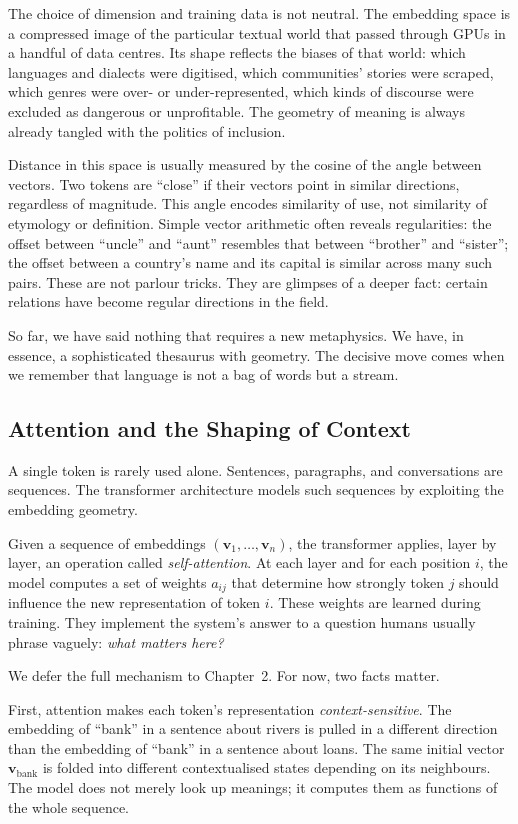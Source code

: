 The choice of dimension and training data is not neutral. The embedding space is a compressed image of the particular textual world that passed through GPUs in a handful of data centres. Its shape reflects the biases of that world: which languages and dialects were digitised, which communities' stories were scraped, which genres were over- or under-represented, which kinds of discourse were excluded as dangerous or unprofitable. The geometry of meaning is always already tangled with the politics of inclusion.

Distance in this space is usually measured by the cosine of the angle between vectors. Two tokens are ``close'' if their vectors point in similar directions, regardless of magnitude. This angle encodes similarity of use, not similarity of etymology or definition. Simple vector arithmetic often reveals regularities: the offset between ``uncle'' and ``aunt'' resembles that between ``brother'' and ``sister''; the offset between a country's name and its capital is similar across many such pairs. These are not parlour tricks. They are glimpses of a deeper fact: certain relations have become regular directions in the field.

So far, we have said nothing that requires a new metaphysics. We have, in essence, a sophisticated thesaurus with geometry. The decisive move comes when we remember that language is not a bag of words but a stream.

\subsection*{Attention and the Shaping of Context}

A single token is rarely used alone. Sentences, paragraphs, and conversations are sequences. The transformer architecture models such sequences by exploiting the embedding geometry.

Given a sequence of embeddings $(\mathbf{v}_1, \ldots, \mathbf{v}_n)$, the transformer applies, layer by layer, an operation called \emph{self-attention}. At each layer and for each position $i$, the model computes a set of weights $a_{ij}$ that determine how strongly token $j$ should influence the new representation of token $i$. These weights are learned during training. They implement the system's answer to a question humans usually phrase vaguely: \emph{what matters here?}

We defer the full mechanism to Chapter~2. For now, two facts matter.

First, attention makes each token's representation \emph{context-sensitive}. The embedding of ``bank'' in a sentence about rivers is pulled in a different direction than the embedding of ``bank'' in a sentence about loans. The same initial vector $\mathbf{v}_{\text{bank}}$ is folded into different contextualised states depending on its neighbours. The model does not merely look up meanings; it computes them as functions of the whole sequence.

